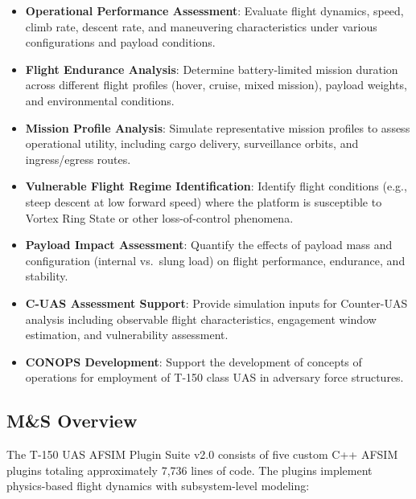 \documentclass[11pt, letterpaper]{article}
\begin{document}
\begin{itemize}
    \item \unclass \textbf{Operational Performance Assessment}: Evaluate flight dynamics, speed, climb rate, descent rate, and maneuvering characteristics under various configurations and payload conditions.
    \item \unclass \textbf{Flight Endurance Analysis}: Determine battery-limited mission duration across different flight profiles (hover, cruise, mixed mission), payload weights, and environmental conditions.
    \item \unclass \textbf{Mission Profile Analysis}: Simulate representative mission profiles to assess operational utility, including cargo delivery, surveillance orbits, and ingress/egress routes.
    \item \unclass \textbf{Vulnerable Flight Regime Identification}: Identify flight conditions (e.g., steep descent at low forward speed) where the platform is susceptible to Vortex Ring State or other loss-of-control phenomena.
    \item \unclass \textbf{Payload Impact Assessment}: Quantify the effects of payload mass and configuration (internal vs.\ slung load) on flight performance, endurance, and stability.
    \item \unclass \textbf{C-UAS Assessment Support}: Provide simulation inputs for Counter-UAS analysis including observable flight characteristics, engagement window estimation, and vulnerability assessment.
    \item \unclass \textbf{CONOPS Development}: Support the development of concepts of operations for employment of T-150 class UAS in adversary force structures.
\end{itemize}

\subsection{\unclass M\&S Overview}

\unclass The T-150 UAS AFSIM Plugin Suite v2.0 consists of five custom C++ AFSIM plugins totaling approximately 7,736 lines of code. The plugins implement physics-based flight dynamics with subsystem-level modeling:
\end{document}
